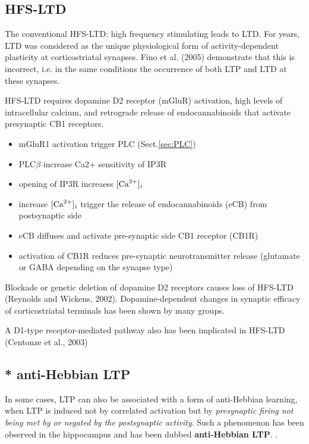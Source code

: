 \subsection{HFS-LTD}
\label{sec:HFS-LTD}

The conventional HFS-LTD: high frequency stimulating leads to LTD.
For years, LTD was considered as the unique physiological
form of activity-dependent plasticity at corticostriatal synapses.
Fino et al. (2005) demonstrate that this is incorrect, i.e. in the same
conditions the occurrence of both LTP and LTD at these synapses. 


HFS-LTD  requires dopamine D2 receptor (mGluR) activation, high levels of
intracellular calcium, and retrograde release of endocannabinoids that activate
presynaptic CB1 receptors.
\begin{itemize}
  \item mGluR1 activation trigger PLC (Sect.\ref{sec:PLC})
  \item PLC$\beta$ increase Ca2+ sensitivity of IP3R
  \item opening of IP3R increaess $[{\text{Ca}^{2+}}]_i$ 
  \item increase $[{\text{Ca}^{2+}}]_i$ trigger the release of endocannabinoids (eCB) from
  postsynaptic side
  \item eCB diffuses and activate pre-synaptic side CB1 receptor (CB1R)
  \item activation of CB1R reduces pre-synaptic neurotransmitter release
  (glutamate or GABA depending on the synapse type)
\end{itemize}

Blockade or genetic deletion of dopamine D2 receptors causes loss of HFS-LTD
(Reynolds and Wickens, 2002). Dopamine-dependent changes in synaptic efficacy of
corticostriatal terminals has been shown by many groups.

A D1-type receptor-mediated pathway also has been implicated in HFS-LTD
(Centonze et al., 2003)

\subsection{ * anti-Hebbian LTP}

In some cases, LTP can also be associated with a form of anti-Hebbian learning,
when LTP is induced not by correlated activation but by {\it presynaptic firing
not being met by or negated by the postsynaptic activity}.
Such a phenomenon has been observed in the hippocampus and has been
dubbed {\bf anti-Hebbian LTP}. \citep{choe2014}.

